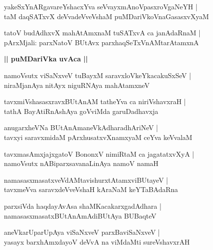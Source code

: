 \documentclass[twoside,12pt,openright]{book}
\newcounter{shloka}[chapter]
\def\uvaca#1{\centerline{{\large\textbf{#1}}}}
\begin{document}
\begin{shloka}%
yakeSxYnARgavareYshacxYva seVvayxmAnoVpasxroVgaNeYH |\\
taM daqSATxvX deVvadeVveVshaM puMDariVkoVnaGasasxvXyaM 
\end{shloka}

\begin{shloka}%
tatoV budAdhxvX mahAtAmxnaM tuSATxvA ca janAdaRnaM |\\
pArxMjali: parxNatoV BUtAvx parxhaqSeTxVnAMtarAtamxnA 
\end{shloka}

\uvaca{|| puMDariVka uvAca ||}

\begin{shloka}%
namoVsutx viSaNxveV tuBayxM saravxloVkeYkacakuSxSeV |\\
niraMjanAya nitAyx niguRNAya mahAtamxneV 
\end{shloka}

\begin{shloka}%
tavxmiVshasasxravxBUtAnAM tatheYva ca niriVshavxraH |\\
tathA BayAtiRnAshAya goVviMda garuDadhavxja 
\end{shloka}

\begin{shloka}%
anugarxheVNa BUtAnAmaneVkAdharadhAriNeV |\\
tavxyi saravxmidaM pArxhusatxvXnamxyaM ceYva keVvalaM 
\end{shloka}

\begin{shloka}%
tavxmasAmxjajxgatoV BononxV nimiRtaM ca jagatatxvXyA |\\
namoVsutx nABiparxsavanaLinAya namoV namaH 
\end{shloka}

\begin{shloka}%
namasasxmasatxveVdAMtavishurxtAtamxviBUtayeV |\\
tavxmeVva saravxdeVveVshaH kAraNaM keYTaBAdaRna 
\end{shloka}

\begin{shloka}%
parxsiVda haqdayAvAsa shaMKacakarxgadAdhara |\\
namasasxmasatxBUtAnAmAdiBUtAya BUBaqteV 
\end{shloka}

\begin{shloka}%
aneVkarUparUpAya viSaNxveV parxBaviSaNxveV |\\
yasayx barxhAmxdayoV deVvA na viMdaMti sureVshavxrAH 
\end{shloka}
\end{document}
